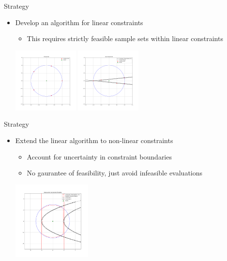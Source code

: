 \documentclass{beamer}
\begin{document}
\begin{frame}{Strategy}
	\begin{itemize}
		\item Develop an algorithm for linear constraints
		\begin{itemize}
			\item This requires strictly feasible sample sets within linear constraints
		\end{itemize}
		\begin{center}
			\includegraphics[width=125px]{images/poised.png}
			\includegraphics[width=125px]{images/not_poised.png}
		\end{center}
	\end{itemize}
\end{frame}

\begin{frame}{Strategy}
	\begin{itemize}
		\item Extend the linear algorithm to non-linear constraints
		\begin{itemize}
			\item Account for uncertainty in constraint boundaries
			\item No gaurantee of feasibility, just avoid infeasible evaluations
		\end{itemize}
		\begin{center}
			\includegraphics[width=150px]{images/modeled_constraints.png}
		\end{center}
	\end{itemize}
\end{frame}
\end{document}
